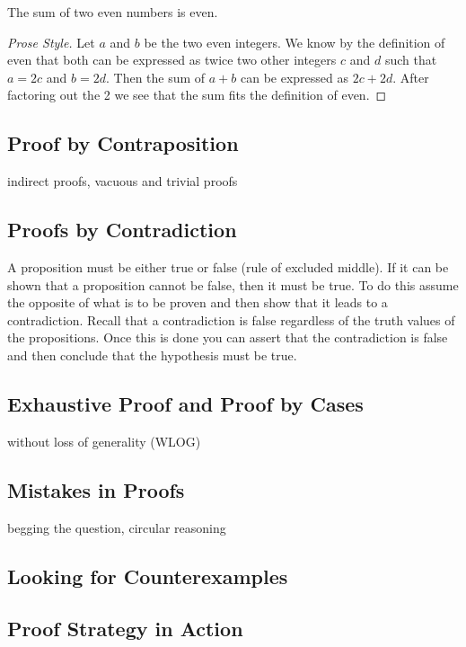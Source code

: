 \begin{theorem}
The sum of two even numbers is even.
\begin{proof}[Prose Style]
Let $a$ and $b$ be the two even integers. We know by the definition of even that both can be expressed as twice two other integers $c$ and $d$ such that $a=2c$ and $b=2d$. Then the sum of $a+b$ can be expressed as $2c+2d$. After factoring out  the 2 we see that the sum fits the definition of even.
\end{proof}
\end {theorem}


    \subsection {Proof by Contraposition}
    indirect proofs, vacuous and trivial proofs
    \subsection {Proofs by Contradiction} 
    A proposition must be either true or false (rule of excluded middle). If it can be shown that a proposition cannot be false, then it must be true. To do this assume the opposite of what is to be proven and then show that it leads to a contradiction. Recall that a contradiction is false regardless of the truth values of the propositions. Once this is done you can assert that the contradiction is false and then conclude that the hypothesis must be true.
    \subsection {Exhaustive Proof and Proof by Cases}
    without loss of generality (WLOG)
    \subsection {Mistakes in Proofs}
    begging the question, circular reasoning


    
    

    \subsection {Looking for Counterexamples}
    \subsection {Proof Strategy in Action}
